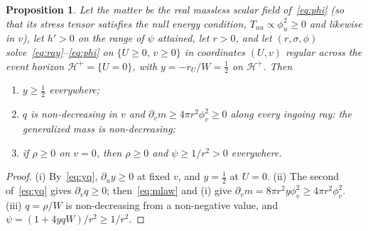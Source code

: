 \documentclass[11pt]{article}
\newtheorem{prop}{Proposition}
\begin{document}
\begin{prop}\label{prop:y}
Let the matter be the real massless scalar field of~\eqref{eq:phi} (so that its stress tensor satisfies the null energy condition, $T_{uu}\propto\phi_u^{2}\ge0$ and likewise in $v$), let $h'>0$ on the range of $\psi$ attained, let $r>0$, and let $(r,\sigma,\phi)$ solve~\eqref{eq:ray}--\eqref{eq:phi} on $\{U\ge0,\,v\ge0\}$ in coordinates $(U,v)$ regular across the event horizon $\mathcal H^{+}=\{U=0\}$, with $y=-r_U/W=\tfrac12$ on $\mathcal H^{+}$. Then
\begin{enumerate}
\item[(i)] $y\ge\tfrac12$ everywhere;
\item[(ii)] $q$ is non-decreasing in $v$ and $\partial_vm\ge4\pi r^{2}\phi_v^{2}\ge0$ along every ingoing ray: the generalized mass is non-decreasing;
\item[(iii)] if $\rho\ge0$ on $v=0$, then $\rho\ge0$ and $\psi\ge1/r^{2}>0$ everywhere.
\end{enumerate}
\end{prop}
\begin{proof}
(i) By~\eqref{eq:yq}, $\partial_uy\ge0$ at fixed $v$, and $y=\tfrac12$ at $U=0$. (ii) The second of~\eqref{eq:yq} gives $\partial_vq\ge0$; then~\eqref{eq:mlaw} and (i) give $\partial_vm=8\pi r^{2}y\phi_v^{2}\ge4\pi r^{2}\phi_v^{2}$. (iii) $q=\rho/W$ is non-decreasing from a non-negative value, and $\psi=(1+4yqW)/r^{2}\ge1/r^{2}$.
\end{proof}
\end{document}
